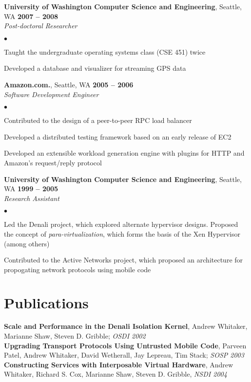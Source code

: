 \documentclass[margin,line]{res}
\newenvironment{list2}{
  \begin{list}{$\bullet$}{%
      \setlength{\itemsep}{0in}
      \setlength{\parsep}{0in} \setlength{\parskip}{0in}
      \setlength{\topsep}{0in} \setlength{\partopsep}{0in} 
      \setlength{\leftmargin}{0.2in}}}{\end{list}}
\begin{document}
\begin{resume}
\textbf{University of Washington Computer Science and Engineering}, Seattle,
WA \hfill \textbf{2007 -- 2008}\\\vspace{-4mm}
\textsl{Post-doctoral Researcher} \\
\begin{list2}
    \item Taught the undergraduate operating systems class (CSE 451) twice
    \item Developed a database and visualizer for streaming GPS data
\end{list2}

\textbf{Amazon.com.}, Seattle, WA \hfill \textbf{2005 -- 2006} \\\vspace{-4mm}
\textsl{Software Development Engineer} \\
\begin{list2}
  \item Contributed to the design of a peer-to-peer RPC load balancer
  \item Developed a distributed testing framework based on an early release of EC2
  \item Developed an extensible workload generation engine with  plugins for
    HTTP and Amazon's request/reply protocol
\end{list2}

\textbf{University of Washington Computer Science and Engineering}, Seattle,
WA \hfill \textbf{1999 -- 2005}\\\vspace{-4mm}
\textsl{Research Assistant} \\
\begin{list2}
  \item Led the Denali project, which explored alternate hypervisor
    designs.  Proposed the concept of \textit{para-virtualization}, which forms the
    basis of the Xen Hypervisor (among others)
 \item Contributed to the Active Networks project, which proposed an
   architecture for propogating network protocols using mobile code
\end{list2}

\section{\sc Publications}
\textbf{Scale and Performance in the Denali Isolation Kernel}, Andrew
Whitaker, Marianne Shaw, Steven D. Gribble; \textit{OSDI 2002}\\
\textbf{Upgrading Transport Protocols Using Untrusted Mobile Code}, Parveen
Patel, Andrew Whitaker, David Wetherall, Jay Lepreau, Tim Stack; \textit{SOSP 2003} \\
\textbf{Constructing Services with Interposable Virtual Hardware}, Andrew
Whitaker, Richard S. Cox, Marianne Shaw, Steven D. Gribble, \textit{NSDI 2004}\\

\end{resume}
\end{document}
